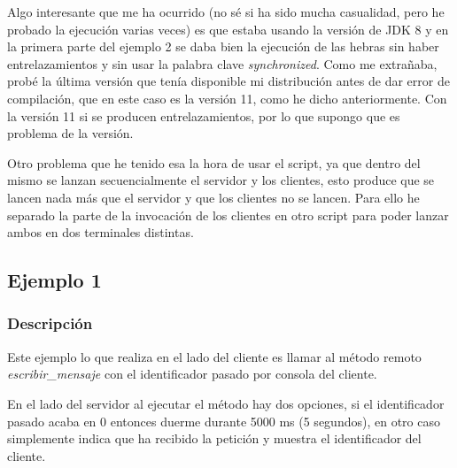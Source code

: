 \documentclass{article}
\begin{document}
\bigskip

Algo interesante que me ha ocurrido (no sé si ha sido mucha casualidad, pero he probado la ejecución varias veces) es que estaba usando la versión de JDK 8 y en la primera parte del ejemplo 2 se daba bien la ejecución de las hebras sin haber entrelazamientos y sin usar la palabra clave \textit{synchronized}. Como me extrañaba, probé la última versión que tenía disponible mi distribución antes de dar error de compilación, que en este caso es la versión 11, como he dicho anteriormente. Con la versión 11 si se producen entrelazamientos, por lo que supongo que es problema de la versión.

\bigskip
Otro problema que he tenido esa la hora de usar el script, ya que dentro del mismo se lanzan secuencialmente el servidor y los clientes, esto produce que se lancen nada más que el servidor y que los clientes no se lancen. Para ello he separado la parte de la invocación de los clientes en otro script para poder lanzar ambos en dos terminales distintas.

\subsection{Ejemplo 1}
\subsubsection{Descripción}
Este ejemplo lo que realiza en el lado del cliente es llamar al método remoto \textit{escribir\_mensaje} con el identificador pasado por consola del cliente.

\bigskip

En el lado del servidor al ejecutar el método hay dos opciones, si el identificador pasado acaba en 0 entonces duerme durante 5000 ms (5 segundos), en otro caso simplemente indica que ha recibido la petición y muestra el identificador del cliente.
\end{document}
